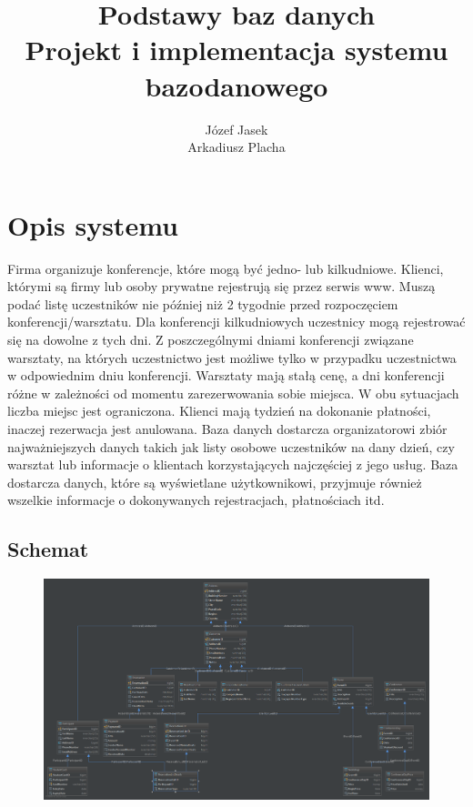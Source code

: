 \documentclass[]{article}
\title{Podstawy baz danych\\Projekt i implementacja systemu bazodanowego}
\author{Józef Jasek \\ Arkadiusz Placha}
\date{}
\begin{document}
\maketitle

\section{Opis systemu}
Firma organizuje konferencje, które mogą być jedno- lub kilkudniowe. Klienci, którymi są firmy lub osoby prywatne rejestrują się przez serwis www. Muszą podać listę uczestników nie później niż 2 tygodnie przed rozpoczęciem konferencji/warsztatu. Dla konferencji kilkudniowych uczestnicy mogą rejestrować się na dowolne z tych dni. Z poszczególnymi dniami konferencji związane warsztaty, na których uczestnictwo jest możliwe tylko w przypadku uczestnictwa w odpowiednim dniu konferencji. Warsztaty mają stałą cenę, a dni konferencji różne w zależności od momentu zarezerwowania sobie miejsca. W obu sytuacjach liczba miejsc jest ograniczona. Klienci mają tydzień na dokonanie płatności, inaczej rezerwacja jest anulowana. Baza danych dostarcza organizatorowi zbiór najważniejszych danych takich jak listy osobowe uczestników na dany dzień, czy warsztat lub informacje o klientach korzystających najczęściej z jego usług. Baza dostarcza danych, które są wyświetlane użytkownikowi, przyjmuje również wszelkie informacje o dokonywanych rejestracjach, płatnościach itd.

\begin{landscape}
	\section{Schemat}
	\begin{figure}[H]
		\centering
		\includegraphics[height=0.8\textheight]{database}
	\end{figure}
\end{landscape}
\end{document}

